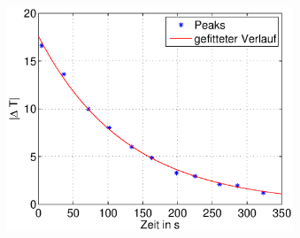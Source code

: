 \begin{frame}
\begin{columns}[c]
\begin{figure}[H]
\begin{center}
            \end{center}
            \end{figure}
            \begin{figure}[H]
            \begin{center}
                    \includegraphics[scale=0.3]{./img/plots/2_c_100_Peaks.eps}
            \end{center}
            \end{figure}
     \end{columns}
\end{frame}

